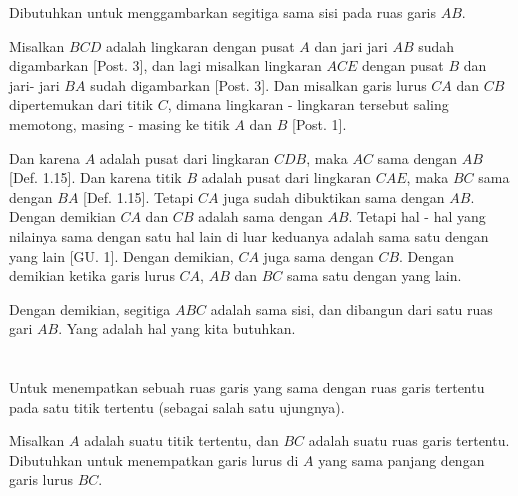 \documentclass[a4paper]{book}
\begin{document}
Dibutuhkan untuk menggambarkan segitiga sama sisi pada ruas garis $AB$.

Misalkan $BCD$ adalah lingkaran dengan pusat $A$ dan jari jari $AB$ sudah 
digambarkan [Post. 3], dan lagi misalkan lingkaran $ACE$ dengan pusat $B$ 
dan jari- jari $BA$ sudah digambarkan [Post. 3]. Dan misalkan garis lurus 
$CA$ dan $CB$ dipertemukan dari titik $C$, dimana lingkaran - lingkaran 
tersebut saling memotong, masing - masing ke titik $A$ dan $B$ [Post. 1].  


Dan karena $A$ adalah pusat dari lingkaran $CDB$, maka $AC$ sama dengan $AB$
[Def. 1.15]. Dan karena titik $B$ adalah pusat dari lingkaran $CAE$, maka
$BC$ sama dengan $BA$ [Def. 1.15]. Tetapi $CA$ juga sudah dibuktikan sama 
dengan $AB$. Dengan demikian $CA$ dan $CB$ adalah sama dengan $AB$. Tetapi
hal - hal yang nilainya sama dengan satu hal lain di luar keduanya adalah sama
satu dengan yang lain [GU. 1]. Dengan demikian, $CA$ juga sama dengan $CB$.  
Dengan demikian ketika garis lurus $CA$, $AB$ dan $BC$ sama satu dengan 
yang lain.

Dengan demikian, segitiga $ABC$ adalah sama sisi, dan dibangun dari
satu ruas gari $AB$. Yang adalah hal yang kita butuhkan.  

\section*{\centering \thesection} 

Untuk menempatkan sebuah ruas garis yang sama dengan ruas garis tertentu
pada satu titik tertentu (sebagai salah satu ujungnya).


Misalkan $A$ adalah suatu titik tertentu, dan $BC$ adalah suatu ruas garis
tertentu. Dibutuhkan untuk menempatkan garis lurus di $A$ yang sama panjang
dengan garis lurus $BC$.
\end{document}
